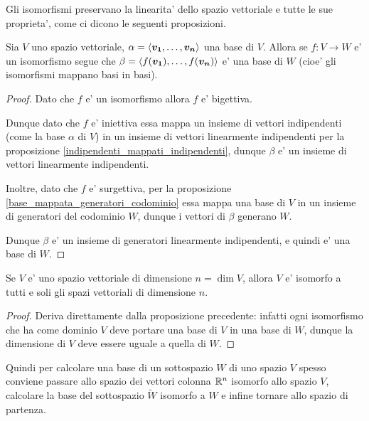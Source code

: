 Gli isomorfismi preservano la linearita' dello spazio vettoriale e tutte le sue proprieta', come ci dicono le seguenti proposizioni.

\begin{proposition}
    Sia $V$ uno spazio vettoriale, $\alpha = \left\langle \bm{v_1}, \dots, \bm{v_n} \right\rangle$ una base di $V$. Allora se $f : V \to W$ e' un isomorfismo segue che $\beta = \left\langle f(\bm{v_1}), \dots, f(\bm{v_n}) \right\rangle$ e' una base di $W$ (cioe' gli isomorfismi mappano basi in basi).
\end{proposition}
\begin{proof}
    Dato che $f$ e' un isomorfismo allora $f$ e' bigettiva.

    Dunque dato che $f$ e' iniettiva essa mappa un insieme di vettori indipendenti (come la base $\alpha$ di $V$) in un insieme di vettori linearmente indipendenti per la proposizione \ref{indipendenti_mappati_indipendenti}, dunque $\beta$ e' un insieme di vettori linearmente indipendenti. 

    Inoltre, dato che $f$ e' surgettiva, per la proposizione \ref{base_mappata_generatori_codominio} essa mappa una base di $V$ in un insieme di generatori del codominio $W$, dunque i vettori di $\beta$ generano $W$.

    Dunque $\beta$ e' un insieme di generatori linearmente indipendenti, e quindi e' una base di $W$.
\end{proof}

\begin{proposition}
    Se $V$ e' uno spazio vettoriale di dimensione $n = \dim V$, allora $V$ e' isomorfo a tutti e soli gli spazi vettoriali di dimensione $n$.
\end{proposition}
\begin{proof}
    Deriva direttamente dalla proposizione precedente: infatti ogni isomorfismo che ha come dominio $V$ deve portare una base di $V$ in una base di $W$, dunque la dimensione di $V$ deve essere uguale a quella di $W$.
\end{proof}

Quindi per calcolare una base di un sottospazio $W$ di uno spazio $V$ spesso conviene passare allo spazio dei vettori colonna $\mathbb{R}^n$ isomorfo allo spazio $V$, calcolare la base del sottospazio $\tilde{W}$ isomorfo a $W$ e infine tornare allo spazio di partenza.

